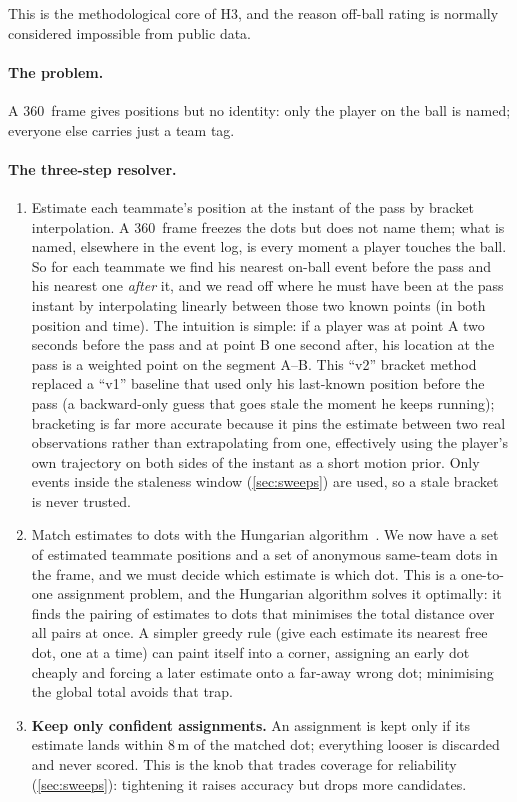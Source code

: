 \documentclass[12pt,a4paper]{article}
\begin{document}
This is the methodological core of H3, and the reason off-ball rating is normally considered impossible from public data.

\paragraph{The problem.}
A 360~frame gives positions but no identity: only the player on the ball is named; everyone else carries just a team tag.

\paragraph{The three-step resolver.}
\begin{enumerate}
    \item Estimate each teammate's position at the instant of the pass by bracket interpolation. A 360~frame freezes the dots but does not name them; what is named, elsewhere in the event log, is every moment a player touches the ball. So for each teammate we find his nearest on-ball event before the pass and his nearest one \emph{after} it, and we read off where he must have been at the pass instant by interpolating linearly between those two known points (in both position and time). The intuition is simple: if a player was at point A two seconds before the pass and at point B one second after, his location at the pass is a weighted point on the segment A--B. This ``v2'' bracket method replaced a ``v1'' baseline that used only his last-known position before the pass (a backward-only guess that goes stale the moment he keeps running); bracketing is far more accurate because it pins the estimate between two real observations rather than extrapolating from one, effectively using the player's own trajectory on both sides of the instant as a short motion prior. Only events inside the staleness window (\cref{sec:sweeps}) are used, so a stale bracket is never trusted.
    \item Match estimates to dots with the Hungarian algorithm~\cite{hungarian}. We now have a set of estimated teammate positions and a set of anonymous same-team dots in the frame, and we must decide which estimate is which dot. This is a one-to-one assignment problem, and the Hungarian algorithm solves it optimally: it finds the pairing of estimates to dots that minimises the total distance over all pairs at once. A simpler greedy rule (give each estimate its nearest free dot, one at a time) can paint itself into a corner, assigning an early dot cheaply and forcing a later estimate onto a far-away wrong dot; minimising the global total avoids that trap.
    \item \textbf{Keep only confident assignments.} An assignment is kept only if its estimate lands within 8\,m of the matched dot; everything looser is discarded and never scored. This is the knob that trades coverage for reliability (\cref{sec:sweeps}): tightening it raises accuracy but drops more candidates.
\end{enumerate}
\end{document}
